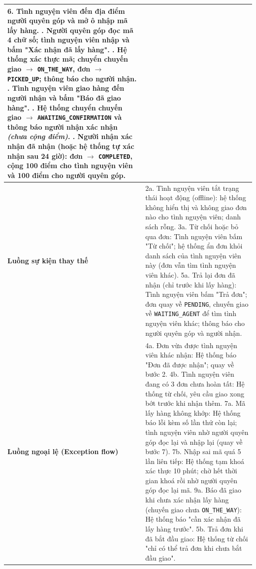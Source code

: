 \documentclass[../main.tex]{subfiles}%
\begin{document}
\begin{longtable}{|p{3.5cm}|p{11.5cm}|}
6. Tình nguyện viên đến địa điểm người quyên góp và mở ô nhập mã lấy hàng. \newline
7. Người quyên góp đọc mã 4 chữ số; tình nguyện viên nhập và bấm "Xác nhận đã lấy hàng". \newline
8. Hệ thống xác thực mã; chuyển chuyến giao $\to$ \texttt{ON\_THE\_WAY}, đơn $\to$ \texttt{PICKED\_UP}; thông báo cho người nhận. \newline
9. Tình nguyện viên giao hàng đến người nhận và bấm "Báo đã giao hàng". \newline
10. Hệ thống chuyển chuyến giao $\to$ \texttt{AWAITING\_CONFIRMATION} và thông báo người nhận xác nhận \textit{(chưa cộng điểm)}. \newline
11. Người nhận xác nhận đã nhận (hoặc hệ thống tự xác nhận sau 24 giờ): đơn $\to$ \texttt{COMPLETED}, cộng 100 điểm cho tình nguyện viên và 100 điểm cho người quyên góp. \\ \hline
\textbf{Luồng sự kiện thay thế} &
2a. Tình nguyện viên tắt trạng thái hoạt động (offline): hệ thống không hiển thị và không giao đơn nào cho tình nguyện viên; danh sách rỗng. \newline
3a. Từ chối hoặc bỏ qua đơn: Tình nguyện viên bấm "Từ chối"; hệ thống ẩn đơn khỏi danh sách của tình nguyện viên này (đơn vẫn tìm tình nguyện viên khác). \newline
5a. Trả lại đơn đã nhận (chỉ trước khi lấy hàng): Tình nguyện viên bấm "Trả đơn"; đơn quay về \texttt{PENDING}, chuyến giao về \texttt{WAITING\_AGENT} để tìm tình nguyện viên khác; thông báo cho người quyên góp và người nhận. \\ \hline
\textbf{Luồng ngoại lệ (Exception flow)} &
4a. Đơn vừa được tình nguyện viên khác nhận: Hệ thống báo "Đơn đã được nhận"; quay về bước 2. \newline
4b. Tình nguyện viên đang có 3 đơn chưa hoàn tất: Hệ thống từ chối, yêu cầu giao xong bớt trước khi nhận thêm. \newline
7a. Mã lấy hàng không khớp: Hệ thống báo lỗi kèm số lần thử còn lại; tình nguyện viên nhờ người quyên góp đọc lại và nhập lại (quay về bước 7). \newline
7b. Nhập sai mã quá 5 lần liên tiếp: Hệ thống tạm khoá xác thực 10 phút; chờ hết thời gian khoá rồi nhờ người quyên góp đọc lại mã. \newline
9a. Báo đã giao khi chưa xác nhận lấy hàng (chuyến giao chưa \texttt{ON\_THE\_WAY}): Hệ thống báo "cần xác nhận đã lấy hàng trước". \newline
5b. Trả đơn khi đã bắt đầu giao: Hệ thống từ chối "chỉ có thể trả đơn khi chưa bắt đầu giao". \\ \hline
\end{longtable}
\endgroup
\end{document}
